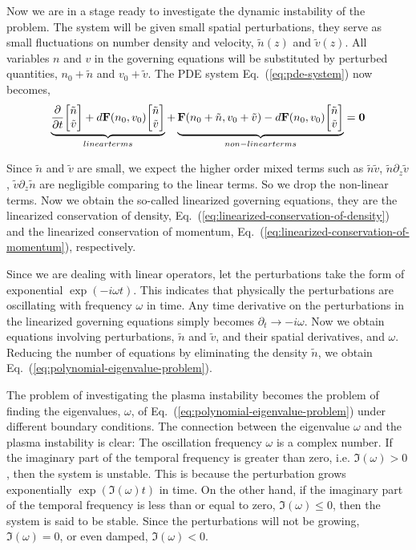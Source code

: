 Now we are in a stage ready to investigate the dynamic instability of the problem. The system will be given small spatial perturbations, they serve as small fluctuations on number density and velocity, $\tilde{n}(z)$ and $\tilde{v}(z)$. All variables $n$ and $v$ in the governing equations will be substituted by perturbed quantities, $n_0+\tilde{n}$ and $v_0+\tilde{v}$. The PDE system Eq.~(\ref{eq:pde-system}) now becomes,
\begin{equation}
	\underbrace{\pdv{t}\mqty[\tilde{n}\\ \tilde{v}] + d\mathbf{F}(n_0,v_0)\mqty[\tilde{n}\\ \tilde{v}] }_{linear terms}
	+ \underbrace{\mathbf{F}(n_0+\tilde{n}, v_0+\tilde{v}) - d\mathbf{F}(n_0,v_0)\mqty[\tilde{n}\\ \tilde{v}]}_{non-linear terms}
	= \mathbf{0}
	\label{eq:perturbed-pde-system}
\end{equation}

Since $\tilde{n}$ and $\tilde{v}$ are small, we expect the higher order mixed terms such as $\tilde{n}\tilde{v}$, $\tilde{n}\partial_z\tilde{v}$, $\tilde{v}\partial_z\tilde{n}$ are negligible comparing to the linear terms. So we drop the non-linear terms. Now we obtain the so-called linearized governing equations, they are the linearized conservation of density, Eq.~(\ref{eq:linearized-conservation-of-density}) and the linearized conservation of momentum, Eq.~(\ref{eq:linearized-conservation-of-momentum}), respectively.

Since we are dealing with linear operators, let the perturbations take the form of exponential $\exp(-i\omega t)$. This indicates that physically the perturbations are oscillating with frequency $\omega$ in time. Any time derivative on the perturbations in the linearized governing equations simply becomes $\partial_t \to -i\omega$. Now we obtain equations involving perturbations, $\tilde{n}$ and $\tilde{v}$, and their spatial derivatives, and $\omega$. Reducing the number of equations by eliminating the density $\tilde{n}$, we obtain Eq.~(\ref{eq:polynomial-eigenvalue-problem}).

The problem of investigating the plasma instability becomes the problem of finding the eigenvalues, $\omega$, of Eq.~(\ref{eq:polynomial-eigenvalue-problem}) under different boundary conditions. The connection between the eigenvalue $\omega$ and the plasma instability is clear: The oscillation frequency $\omega$ is a complex number. If the imaginary part of the temporal frequency is greater than zero, i.e. $\Im(\omega) > 0$, then the system is unstable. This is because the perturbation grows exponentially $\exp(\Im(\omega)t)$ in time. On the other hand, if the imaginary part of the temporal frequency is less than or equal to zero, $\Im(\omega) \leq 0$, then the system is said to be stable. Since the perturbations will not be growing, $\Im(\omega)=0$, or even damped, $\Im(\omega) < 0$.


